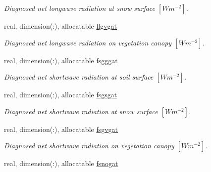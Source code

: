 \begin{DoxyCompactItemize}
\begin{DoxyCompactList}\small\item\em Diagnosed net longwave radiation at snow surface $[W m^{-2} ]$. \end{DoxyCompactList}\item 
\hypertarget{structclass__statevars_1_1class__gather_ade41a104400e94f3127fa3fcdacc7480}{}real, dimension(\+:), allocatable \hyperlink{structclass__statevars_1_1class__gather_ade41a104400e94f3127fa3fcdacc7480}{flgvgat}\label{structclass__statevars_1_1class__gather_ade41a104400e94f3127fa3fcdacc7480}

\begin{DoxyCompactList}\small\item\em Diagnosed net longwave radiation on vegetation canopy $[W m^{-2} ]$. \end{DoxyCompactList}\item 
\hypertarget{structclass__statevars_1_1class__gather_a3011867f8842ce6400ed5538c608b3df}{}real, dimension(\+:), allocatable \hyperlink{structclass__statevars_1_1class__gather_a3011867f8842ce6400ed5538c608b3df}{fsgggat}\label{structclass__statevars_1_1class__gather_a3011867f8842ce6400ed5538c608b3df}

\begin{DoxyCompactList}\small\item\em Diagnosed net shortwave radiation at soil surface $[W m^{-2} ]$. \end{DoxyCompactList}\item 
\hypertarget{structclass__statevars_1_1class__gather_ab37b9a94177a4b66e4f11afd04725e60}{}real, dimension(\+:), allocatable \hyperlink{structclass__statevars_1_1class__gather_ab37b9a94177a4b66e4f11afd04725e60}{fsgsgat}\label{structclass__statevars_1_1class__gather_ab37b9a94177a4b66e4f11afd04725e60}

\begin{DoxyCompactList}\small\item\em Diagnosed net shortwave radiation at snow surface $[W m^{-2} ]$. \end{DoxyCompactList}\item 
\hypertarget{structclass__statevars_1_1class__gather_a50b058047f94d50fd14bae1fabe06d74}{}real, dimension(\+:), allocatable \hyperlink{structclass__statevars_1_1class__gather_a50b058047f94d50fd14bae1fabe06d74}{fsgvgat}\label{structclass__statevars_1_1class__gather_a50b058047f94d50fd14bae1fabe06d74}

\begin{DoxyCompactList}\small\item\em Diagnosed net shortwave radiation on vegetation canopy $[W m^{-2} ]$. \end{DoxyCompactList}\item 
\hypertarget{structclass__statevars_1_1class__gather_af0a6914c667ef39956c372ab71649737}{}real, dimension(\+:), allocatable \hyperlink{structclass__statevars_1_1class__gather_af0a6914c667ef39956c372ab71649737}{fsnogat}\label{structclass__statevars_1_1class__gather_af0a6914c667ef39956c372ab71649737}


\end{DoxyCompactItemize}
